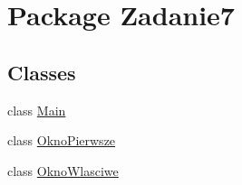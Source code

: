 \hypertarget{namespace_zadanie7}{}\section{Package Zadanie7}
\label{namespace_zadanie7}
\subsection*{Classes}
\begin{DoxyCompactItemize}
\item 
class \hyperlink{class_zadanie7_1_1_main}{Main}
\item 
class \hyperlink{class_zadanie7_1_1_okno_pierwsze}{Okno\+Pierwsze}
\item 
class \hyperlink{class_zadanie7_1_1_okno_wlasciwe}{Okno\+Wlasciwe}
\end{DoxyCompactItemize}
